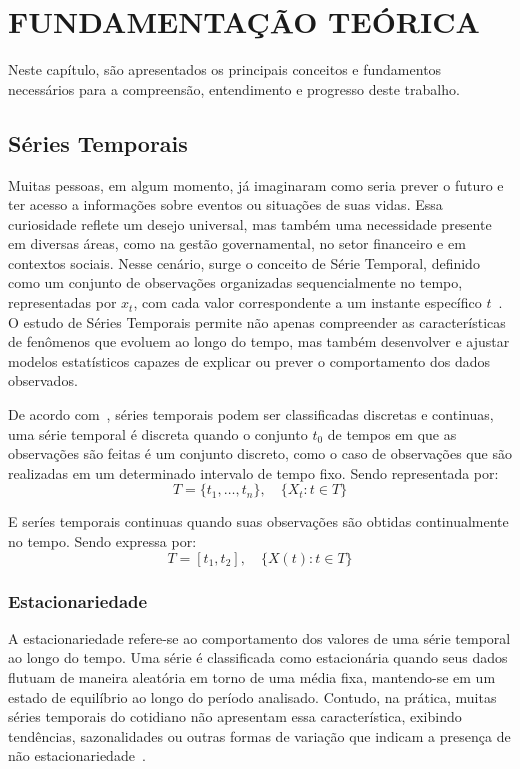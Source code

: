 \chapter{FUNDAMENTAÇÃO TEÓRICA}
Neste capítulo, são apresentados os principais conceitos e fundamentos necessários para a compreensão, 
entendimento e progresso deste trabalho.

\section{Séries Temporais}
    Muitas pessoas, em algum momento, já imaginaram como seria prever o futuro e ter acesso a informações sobre eventos 
    ou situações de suas vidas. Essa curiosidade reflete um desejo universal, mas também uma necessidade presente em 
    diversas áreas, como na gestão governamental, no setor financeiro e em contextos sociais. Nesse cenário, surge o 
    conceito de Série Temporal, definido como um conjunto de observações organizadas sequencialmente no tempo, 
    representadas por \( x_t \), com cada valor correspondente a um instante específico \(t\)~\cite{box2015}. O estudo de 
    Séries Temporais permite não apenas compreender as características de fenômenos que evoluem ao longo do tempo, mas 
    também desenvolver e ajustar modelos estatísticos capazes de explicar ou prever o comportamento dos dados 
    observados.
    
    De acordo com~\cite{brockwell2002}, séries temporais podem ser classificadas 
    discretas e continuas, uma série temporal é discreta quando o conjunto \( t_0 \) de tempos em que as observações 
    são feitas é um conjunto discreto, como o caso de observações que são realizadas em um determinado intervalo de 
    tempo fixo. Sendo representada por:
    \begin{equation}
        T = \{t_1, \dots, t_n\}, \quad \{X_t : t \in T\}
    \end{equation}
    
    
    E seríes temporais continuas quando suas observações são obtidas continualmente 
    no tempo. Sendo expressa por: 
    \begin{equation}
        T = [t_1, t_2], \quad \{X(t) : t \in T\}
    \end{equation}
        
    \subsection{Estacionariedade}
        A estacionariedade refere-se ao comportamento dos valores de uma série temporal ao longo do tempo. Uma série é 
        classificada como estacionária quando seus dados flutuam de maneira aleatória em torno de uma média fixa, mantendo-se em 
        um estado de equilíbrio ao longo do período analisado. Contudo, na prática, muitas séries temporais do cotidiano não 
        apresentam essa característica, exibindo tendências, sazonalidades ou outras formas de variação que indicam a presença de 
        não estacionariedade~\cite{morettin2018}.

